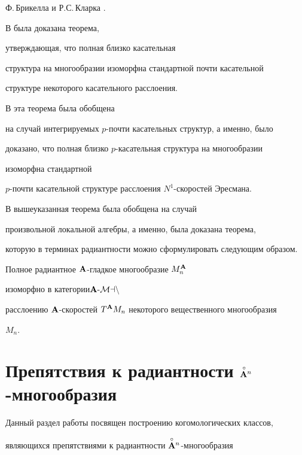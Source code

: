 Ф.\,Брикелла и  Р.С.\,Кларка \cite{Br-Cl}.


В \cite{Br-Cl} была доказана теорема,


утверждающая, что полная близко  касательная


структура на многообразии изоморфна стандартной почти касательной


структуре некоторого касательного расслоения.


В \cite{L-M-S} эта теорема была обобщена


на случай интегрируемых $p$-почти касательных структур, а именно, было


доказано, что полная близко $p$-касательная структура на многообразии 


изоморфна стандартной


$p$-почти касательной структуре расслоения $N^1$-скоростей Эресмана.


В \cite{VSh17} вышеуказанная теорема была обобщена на случай


произвольной локальной алгебры, а именно, была доказана теорема,


которую в терминах радиантности можно сформулировать следующим образом.








\begin{thm}


Полное радиантное ${\bold A}$-гладкое многообразие $M^{\bold A}_n$


изоморфно в категории\linebreak ${\bold A}\text{-}\cal M an$


расслоению ${\bold A}$-скоростей $T^{\bold A} M_n$ некоторого вещественного многообразия


$M_n$.


\end{thm}








\section{Препятствия к радиантности ${\overset{\,\circ}{{\bold A}}{}}{}^n$-многообразия}





Данный раздел работы посвящен построению когомологических классов,


являющихся препятствиями к радиантности $\overset{\circ}{\bold A}{}^n$-многообразия


